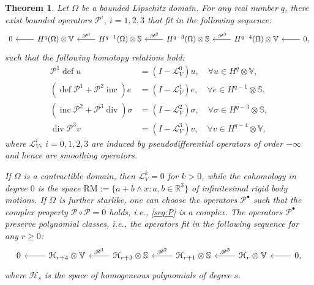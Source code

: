 \documentclass[11pt]{amsart}
\newtheorem{theorem}{Theorem}
\newcommand{\0}{\mathaccent23}
\newcommand\inc{\operatorname{inc}}
\newcommand\deff{\operatorname{def}}
\renewcommand\div{\operatorname{div}}
\newcommand{\bs}{{\scriptscriptstyle \bullet}}
\begin{document}
\begin{theorem}\label{thm:main-example}
Let $\Omega$ be a bounded Lipschitz domain.
For any real number $q$, there exist bounded operators $\mathscr{P}^{i}, ~i=1, 2, 3$ that fit in the following sequence:
\begin{equation} \label{seq:P}
\begin{tikzcd}[swap]
0&\arrow{l} H^{q}(\Omega)\otimes \mathbb{V}&\arrow{l}{\mathscr{P}^{1}}  H^{q-1}(\Omega)\otimes \mathbb{S}&\arrow{l}{\mathscr{P}^{2}}  H^{q-3}(\Omega)\otimes \mathbb{S} &\arrow{l}{\mathscr{P}^{3}}H^{q-4}(\Omega)\otimes \mathbb{V}&\arrow{l}  0,
\end{tikzcd}
\end{equation}
  such that the following homotopy relations hold: 
\begin{align*}
\mathscr{P}^{1}\deff u &=(I-\mathscr{L}_{V}^{0})u, \quad \forall u\in H^{q}\otimes \mathbb{V},\\
(\deff\mathscr{P}^{1}+\mathscr{P}^{2}\inc) e&=(I-\mathscr{L}_{V}^{1})e,   \quad \forall e\in H^{q-1}\otimes \mathbb{S},\\
(\inc\mathscr{P}^{2}+\mathscr{P}^{3}\div) \sigma&=(I-\mathscr{L}_{V}^{2})\sigma,   \quad \forall \sigma\in H^{q-3}\otimes \mathbb{S},\\
\div  \mathscr{P}^{3}v&=(I-\mathscr{L}_{V}^{3})v,   \quad \forall  v\in H^{q-4}\otimes \mathbb{V},
\end{align*}
where $\mathscr{L}_{V}^{i}, ~i=0, 1, 2, 3$ are induced by pseudodifferential operators of order $-\infty$ and hence are smoothing operators.

If   $\Omega$ is  a contractible domain,  then ${\mathscr{L}}_{V}^{k}=0$ for $k>0$, while the cohomology in degree $0$ is the space $\mathrm{RM}:=\{a+b\wedge x: a, b\in \mathbb{R}^{3}\}$ of infinitesimal rigid body motions.  If $\Omega$ is further starlike, one can choose the operators $\mathscr{P}^{\bs}$ such that the complex property $\mathscr{P}\circ \mathscr{P}=0$ holds, i.e., \eqref{seq:P} is a complex. The operators $\mathscr{P}^{\bs}$ preserve polynomial classes, i.e., the operators fit in the following sequence for any $r\geq 0$:
\begin{equation} \label{seq:Hr}
\begin{tikzcd}[swap]
0&\arrow{l} \mathcal{H}_{r+4} \otimes \mathbb{V}&\arrow{l}{\mathscr{P}^{1}} \mathcal{H}_{r+3}\otimes \mathbb{S}&\arrow{l}{\mathscr{P}^{2}}  \mathcal{H}_{r+1}\otimes \mathbb{S} &\arrow{l}{\mathscr{P}^{3}}\mathcal{H}_{r}\otimes \mathbb{V}&\arrow{l}  0,
\end{tikzcd}
\end{equation}
where $\mathcal{H}_{s}$ is the space of homogeneous polynomials of degree $s$. %
\end{theorem}
\end{document}
